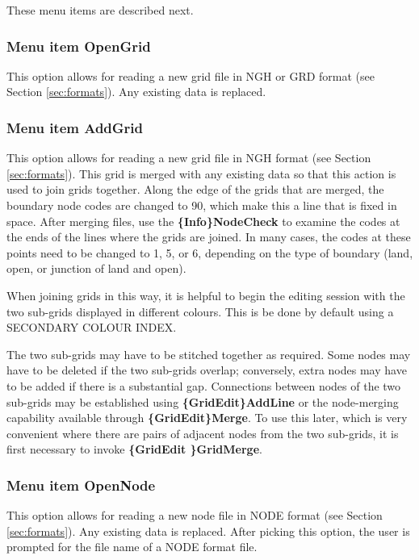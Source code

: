 \documentclass{article}
\begin{document}
These menu items are described next.

\subsubsection[Menu item OpenGrid]{Menu item OpenGrid}
This option allows for reading a new grid file in NGH or GRD format (see Section \ref{sec:formats}). Any existing data is replaced.

\subsubsection[Menu item AddGrid]{Menu item AddGrid}
This option allows for reading a new grid file in NGH format (see Section \ref{sec:formats}). This grid is merged with any existing data so that this action is used to join grids together. Along the edge of the grids that are merged, the boundary node codes are changed to 90, which make this a line that is fixed in space. After merging files, use the \textbf{\{Info\}NodeCheck} to examine the codes at the ends of the lines where the grids are joined. In many cases, the codes at these points need to be changed to 1, 5, or 6, depending on the type of boundary (land, open, or junction of land and open).

When joining grids in this way, it is helpful to begin the editing session with the two sub-grids displayed in different colours. This is be done by default using a SECONDARY COLOUR INDEX.

The two sub-grids may have to be stitched together as required. Some nodes may have to be deleted if the two sub-grids overlap; conversely, extra nodes may have to be added if there is a substantial gap. Connections between nodes of the two sub-grids may be established using \textbf{\{GridEdit\}AddLine} or the node-merging capability available through \textbf{\{GridEdit\}Merge}. To use this later, which is very convenient where there are pairs of adjacent nodes from the two sub-grids, it is first necessary to invoke \textbf{\{GridEdit \}GridMerge}.

\subsubsection[Menu item OpenNode]{Menu item OpenNode}
This option allows for reading a new node file in NODE format (see Section \ref{sec:formats}). Any existing data is replaced. After picking this option, the user is prompted for the file name of a NODE format file.
\end{document}
